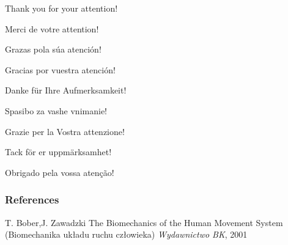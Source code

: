 \documentclass{beamer}
\begin{document}
\begin{frame}
\Large{\centerline{Thank you for your attention!}}
\Large{\centerline{Merci de votre attention!}}
\Large{\centerline{Grazas pola s\'{u}a atenci\'{o}n!}}
\Large{\centerline{Gracias por vuestra atenci\'{o}n!}}
\Large{\centerline{Danke f\"{u}r Ihre Aufmerksamkeit!}}
\Large{\centerline{Spasibo za vashe vnimanie!}}
\Large{\centerline{Grazie per la Vostra attenzione!}}
\Large{\centerline{Tack för er uppmärksamhet!}}
\Large{\centerline{Obrigado pela vossa atenç\~{a}o!}}
\end{frame}

\begin{frame}
\frametitle{References}

\footnotesize{
\begin{thebibliography}{99} %

 T. Bober,J. Zawadzki
\newblock The Biomechanics of the Human Movement System (Biomechanika uk\l{}adu ruchu cz\l{}owieka)
\newblock \emph{Wydawnictwo BK}, 2001
\end{thebibliography}
}
\end{frame}

\end{document}
